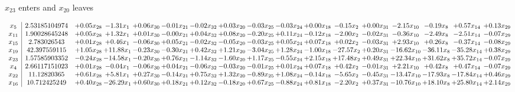 \documentclass[9pt]{article}
\begin{document}
 $ x_{23} $ enters and $ x_{20} $ leaves 

 \[\begin{array}{c| c c@{\hskip 2pt} c@{\hskip 2pt} c@{\hskip 2pt} c@{\hskip 2pt} c@{\hskip 2pt} c@{\hskip 2pt} c@{\hskip 2pt} c@{\hskip 2pt} c@{\hskip 2pt} c@{\hskip 2pt} c@{\hskip 2pt} c@{\hskip 2pt} c@{\hskip 2pt} c@{\hskip 2pt} c@{\hskip 2pt} }
 x_{5}   &  2.53185104974 & +  0.05 x_{28} & -1.31 x_{1} & +  0.06 x_{30} & -0.01 x_{21} & -0.02 x_{32} & +  0.03 x_{20} & -0.03 x_{25} & -0.03 x_{24} & +  0.00 x_{18} & -0.15 x_{2} & +  0.00 x_{31} & -2.15 x_{10} & -0.19 x_{8} & +  0.57 x_{14} & +  0.13 x_{29}\\
 x_{11}   &  1.90028645248 & +  0.05 x_{28} & +  1.32 x_{1} & +  0.01 x_{30} & -0.00 x_{21} & +  0.04 x_{32} & +  0.08 x_{20} & -0.20 x_{25} & +  0.11 x_{24} & -0.12 x_{18} & -2.00 x_{2} & -0.02 x_{31} & -0.36 x_{10} & -2.49 x_{8} & -2.51 x_{14} & -0.07 x_{29}\\
 x_{15}   &  2.783026543 & +  0.01 x_{28} & +  0.46 x_{1} & -0.06 x_{30} & +  0.05 x_{21} & -0.02 x_{32} & -0.05 x_{20} & -0.03 x_{25} & +  0.05 x_{24} & +  0.07 x_{18} & +  0.02 x_{2} & -0.03 x_{31} & +  2.93 x_{10} & +  0.26 x_{8} & -0.37 x_{14} & -0.08 x_{29}\\
 x_{19}   &  42.397559115 & +  1.05 x_{28} & + 11.88 x_{1} & -0.23 x_{30} & -0.30 x_{21} & +  0.42 x_{32} & +  1.21 x_{20} & -3.04 x_{25} & +  1.28 x_{24} & -1.00 x_{18} & -27.57 x_{2} & +  0.20 x_{31} & -16.62 x_{10} & -36.11 x_{8} & -35.28 x_{14} & +  0.38 x_{29}\\
 x_{23}   &  1.57585903352 & -0.24 x_{28} & -14.58 x_{1} & -0.20 x_{30} & +  0.76 x_{21} & -1.14 x_{32} & -1.60 x_{20} & +  1.17 x_{25} & -0.55 x_{24} & +  2.15 x_{18} & + 17.48 x_{2} & +  0.49 x_{31} & + 22.34 x_{10} & + 31.62 x_{8} & + 35.72 x_{14} & -0.07 x_{29}\\
 x_{4}   &  2.66117151023 & +  0.01 x_{28} & -0.04 x_{1} & -0.06 x_{30} & +  0.04 x_{21} & -0.06 x_{32} & -0.03 x_{20} & -0.01 x_{25} & +  0.01 x_{24} & +  0.07 x_{18} & +  0.42 x_{2} & -0.01 x_{31} & +  2.21 x_{10} & +  0.42 x_{8} & +  0.47 x_{14} & -0.07 x_{29}\\
 x_{22}   &  11.12820365 & +  0.61 x_{28} & +  5.81 x_{1} & +  0.27 x_{30} & -0.14 x_{21} & +  0.75 x_{32} & +  1.32 x_{20} & -0.89 x_{25} & +  1.08 x_{24} & -0.14 x_{18} & -5.65 x_{2} & -0.45 x_{31} & -13.47 x_{10} & -17.93 x_{8} & -17.84 x_{14} & +  0.46 x_{29}\\
 x_{16}   &  10.712425249 & +  0.40 x_{28} & -26.29 x_{1} & +  0.60 x_{30} & +  0.18 x_{21} & +  0.12 x_{32} & -0.18 x_{20} & +  0.67 x_{25} & -0.88 x_{24} & +  0.81 x_{18} & -2.20 x_{2} & +  0.37 x_{31} & -10.76 x_{10} & + 18.10 x_{8} & + 25.80 x_{14} & +  2.14 x_{29}\\

\end{array}\]
\end{document}
